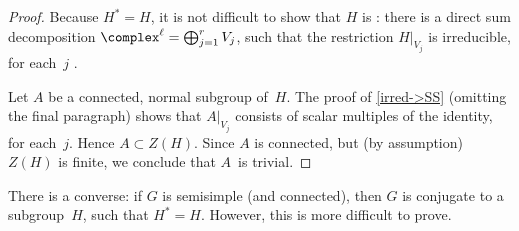 \begin{proof}
 Because $H^* = H$, it is not difficult to show that $H$ is
: there is a
direct sum decomposition 
 $ \complex^\ell = \bigoplus_{j=1}^r V_j $,
 such that the restriction $H|_{V_j}$ is irreducible, for each~$j$
.
 
  Let $A$ be a connected, normal subgroup of~$H$. 
The proof of \cref{irred->SS} (omitting the
final paragraph) shows that $A|_{V_j}$ consists of scalar
multiples of the identity, for each~$j$. Hence $A \subset
Z(H)$. Since $A$ is connected, but (by assumption) $Z(H)$
is finite, we conclude that $A$~is trivial.
 \end{proof}

\begin{rem} \label{SS->SelfAdj}
 There is a converse: if $G$ is semisimple (and connected),
then $G$ is conjugate to a subgroup~$H$, such that $H^* =
H$. However, this is more difficult to prove.
 \end{rem}


